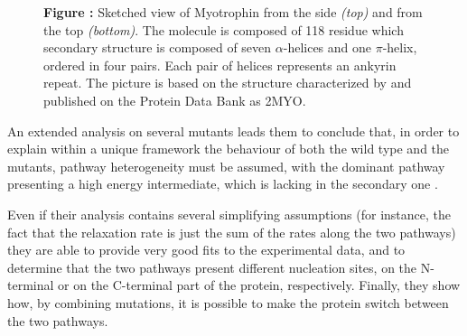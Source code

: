 \begin{figure}
\centering
{}
\begin{minipage}{0.9\textwidth}
\flushleft
\small
{}
{\bf Figure :}
\label{fig:prot}Sketched view of Myotrophin from the side
\emph{(top)} and from the top \emph{(bottom)}. The molecule is composed of 118
residue which secondary structure is composed of seven $\alpha$-helices and one
$\pi$-helix, ordered in four pairs. Each pair of helices represents an ankyrin
repeat. The picture is based on the structure characterized by
\cite{Yang1998} and published on the Protein Data Bank as 2MYO.
\end{minipage}
\end{figure}

An extended analysis on several mutants leads them to conclude that, 
in order to explain within a unique framework the behaviour of both the 
wild type and the mutants, pathway heterogeneity must be assumed, 
with the dominant pathway presenting a high energy intermediate, 
which is lacking in the secondary one \cite{Lowe2007}. 

Even if their analysis contains several simplifying assumptions 
(for instance, the fact that the relaxation rate is just the sum of the rates 
along the two pathways) they are able to provide very good fits to 
the experimental data, and to determine that the two pathways present 
different nucleation sites, on the N-terminal or on the C-terminal part 
of the protein, respectively. Finally, they show how, by combining mutations, 
it is possible to make the protein switch between the two pathways.


